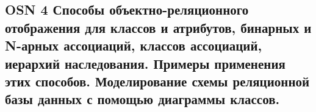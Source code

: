 \subsection{OSN 4 Способы объектно-реляционного отображения для классов и атрибутов, бинарных и N-арных ассоциаций, классов ассоциаций, иерархий наследования. Примеры применения этих способов. Моделирование схемы реляционной базы данных с
помощью диаграммы классов.}
